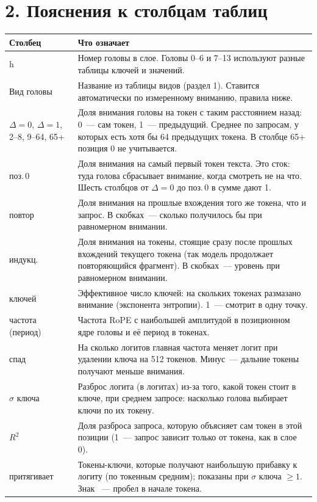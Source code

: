 \documentclass[10pt]{article}
\begin{document}
\section*{2. Пояснения к столбцам таблиц}
\begin{center}\begin{tabular}{|p{3.3cm}|p{22.0cm}|}
\hline \rowcolor{head}\textbf{Столбец} & \textbf{Что означает} \\ \hline
h & Номер головы в слое. Головы 0–6 и 7–13 используют разные таблицы ключей и значений. \\ \hline
Вид головы & Название из таблицы видов (раздел 1). Ставится автоматически по измеренному вниманию, правила ниже. \\ \hline
$\Delta{=}0$, $\Delta{=}1$, 2–8, 9–64, 65+ & Доля внимания головы на токен с таким расстоянием назад: 0~— сам токен, 1~— предыдущий. Среднее по запросам, у которых есть хотя бы 64 предыдущих токена. В столбце 65+ позиция 0 не учитывается. \\ \hline
поз.\,0 & Доля внимания на самый первый токен текста. Это сток: туда голова сбрасывает внимание, когда смотреть не на что. Шесть столбцов от $\Delta{=}0$ до поз.\,0 в сумме дают 1. \\ \hline
повтор & Доля внимания на прошлые вхождения того же токена, что и запрос. В скобках~— сколько получилось бы при равномерном внимании. \\ \hline
индукц. & Доля внимания на токены, стоящие сразу после прошлых вхождений текущего токена (так модель продолжает повторяющийся фрагмент). В скобках~— уровень при равномерном внимании. \\ \hline
ключей & Эффективное число ключей: на скольких токенах размазано внимание (экспонента энтропии). 1~— смотрит в одну точку. \\ \hline
частота (период) & Частота RoPE с наибольшей амплитудой в позиционном ядре головы и её период в токенах. \\ \hline
спад & На сколько логитов главная частота меняет логит при удалении ключа на 512 токенов. Минус~— дальние токены получают меньше внимания. \\ \hline
$\sigma$ ключа & Разброс логита (в логитах) из-за того, какой токен стоит в ключе, при среднем запросе: насколько голова выбирает ключи по их токену. \\ \hline
$R^2$ & Доля разброса запроса, которую объясняет сам токен в этой позиции (1~— запрос зависит только от токена, как в слое 0). \\ \hline
притягивает & Токены-ключи, которые получают наибольшую прибавку к логиту (по токенным средним); показаны при $\sigma$ ключа $\ge 1$. Знак \texttt{\textvisiblespace}~— пробел в начале токена. \\ \hline
\hline\end{tabular}\end{center}
\end{document}
